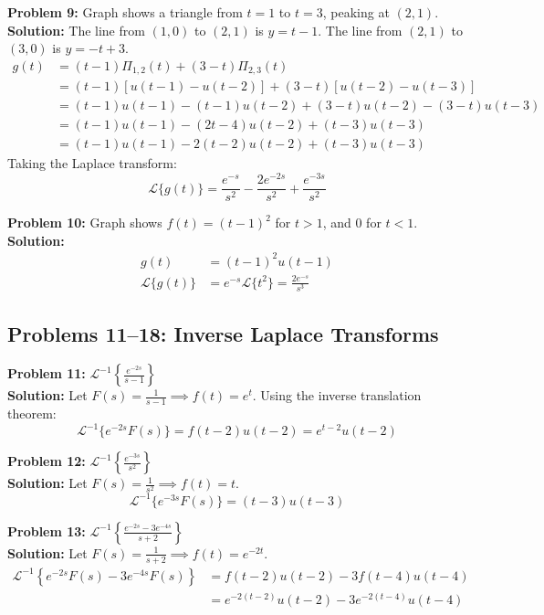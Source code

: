 \documentclass[11pt, letterpaper]{article}
\theoremstyle{definition}
\theoremstyle{remark}
\newcommand{\Lap}{\mathcal{L}}
\begin{document}
\textbf{Problem 9:} Graph shows a triangle from $t=1$ to $t=3$, peaking at $(2,1)$.
\\[4pt]
\textbf{Solution:}
The line from $(1,0)$ to $(2,1)$ is $y = t-1$. The line from $(2,1)$ to $(3,0)$ is $y = -t+3$.
\begin{align*}
g(t) &= (t-1)\Pi_{1,2}(t) + (3-t)\Pi_{2,3}(t) \\
&= (t-1)[u(t-1) - u(t-2)] + (3-t)[u(t-2) - u(t-3)] \\
&= (t-1)u(t-1) - (t-1)u(t-2) + (3-t)u(t-2) - (3-t)u(t-3) \\
&= (t-1)u(t-1) - (2t-4)u(t-2) + (t-3)u(t-3) \\
&= (t-1)u(t-1) - 2(t-2)u(t-2) + (t-3)u(t-3)
\end{align*}
Taking the Laplace transform:
\[
\Lap\{g(t)\} = \frac{e^{-s}}{s^2} - \frac{2e^{-2s}}{s^2} + \frac{e^{-3s}}{s^2}
\]

\textbf{Problem 10:} Graph shows $f(t) = (t-1)^2$ for $t > 1$, and $0$ for $t < 1$.
\\[4pt]
\textbf{Solution:}
\begin{align*}
g(t) &= (t-1)^2 u(t-1) \\
\Lap\{g(t)\} &= e^{-s}\Lap\{t^2\} = \frac{2e^{-s}}{s^3}
\end{align*}

\subsection{Problems 11–18: Inverse Laplace Transforms}

\textbf{Problem 11:} $\Lap^{-1}\left\{ \frac{e^{-2s}}{s-1} \right\}$
\\[4pt]
\textbf{Solution:}
Let $F(s) = \frac{1}{s-1} \implies f(t) = e^t$. Using the inverse translation theorem:
\[
\Lap^{-1}\{e^{-2s}F(s)\} = f(t-2)u(t-2) = e^{t-2}u(t-2)
\]

\textbf{Problem 12:} $\Lap^{-1}\left\{ \frac{e^{-3s}}{s^2} \right\}$
\\[4pt]
\textbf{Solution:}
Let $F(s) = \frac{1}{s^2} \implies f(t) = t$.
\[
\Lap^{-1}\{e^{-3s}F(s)\} = (t-3)u(t-3)
\]

\textbf{Problem 13:} $\Lap^{-1}\left\{ \frac{e^{-2s} - 3e^{-4s}}{s+2} \right\}$
\\[4pt]
\textbf{Solution:}
Let $F(s) = \frac{1}{s+2} \implies f(t) = e^{-2t}$.
\begin{align*}
\Lap^{-1}\left\{ e^{-2s}F(s) - 3e^{-4s}F(s) \right\} &= f(t-2)u(t-2) - 3f(t-4)u(t-4) \\
&= e^{-2(t-2)}u(t-2) - 3e^{-2(t-4)}u(t-4)
\end{align*}
\end{document}
